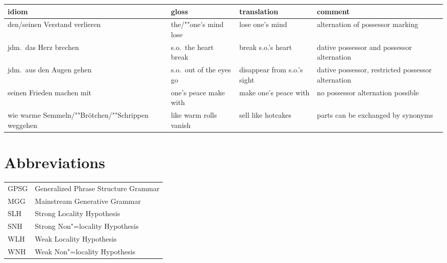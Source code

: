 \documentclass[output=paper
 	        ,biblatex
                ,babelshorthands
                ,newtxmath
                ,draftmode
                ,colorlinks, citecolor=brown
]{langscibook}
\begin{document}
\begin{sideways}
\begin{tabular}{@{}L{4cm}lL{4.0cm}L{4.0cm}}
idiom & gloss & translation & comment\\\hline
%
 {den/seinen Verstand verlieren}
 & {the/""one's mind lose}
 & {lose one's mind}
 & {alternation of possessor marking}
 \\
 {jdm.\ das Herz brechen} & s.o.\ the heart break & break s.o.'s heart
 & {dative possessor and possessor alternation}\\
 {jdm.\ aus den Augen gehen} & s.o.\ out of the eyes go
 & {disappear from s.o.'s sight} &
 {dative possessor, restricted possessor alternation}\\
 {seinen Frieden machen mit}
 & {one's peace make with}
 & {make one's peace with}
 & {no possessor alternation possible}\\
 {wie warme Semmeln/""Brötchen/""Schrippen weggehen}
 & {like warm rolls vanish} & sell like hotcakes & 
 {parts can be exchanged by synonyms}\\
\end{tabular}
\end{sideways}


\section*{Abbreviations}

\begin{tabular}{@{}ll}
GPSG & Generalized Phrase Structure Grammar \citep{GKPS85a}\\
MGG & Mainstream Generative Grammar\\
SLH & Strong Locality Hypothesis\\%
SNH & Strong Non"=locality Hypothesis\\%
WLH & Weak Locality Hypothesis\\%
WNH & Weak Non"=locality Hypothesis\\%
\end{tabular}

\section*{\acknowledgmentsUS}
\end{document}
